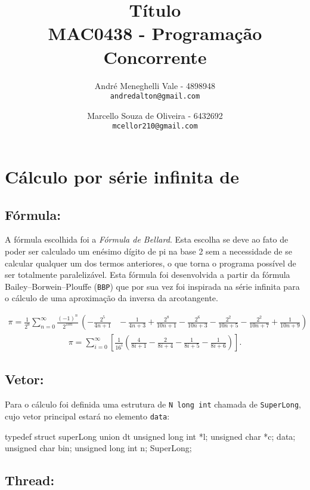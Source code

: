\documentclass[12pt,a4paper]{article}
\title{Título\\MAC0438 - Programação Concorrente}
\author{
    André Meneghelli Vale - 4898948\\
    \texttt{andredalton@gmail.com}
    \and
    Marcello Souza de Oliveira - 6432692\\
    \texttt{mcellor210@gmail.com}
}
\date{}
\begin{document}
\maketitle

\newpage

\section{Cálculo por série infinita de \pi}

\subsection{Fórmula:}
A fórmula escolhida foi a \emph{Fórmula de Bellard}. Esta escolha se deve ao fato de poder ser calculado um enésimo dígito de pi na base 2 sem a necessidade de se calcular qualquer um dos termos anteriores, o que torna o programa possível de ser totalmente paralelizável.
Esta fórmula foi desenvolvida a partir da fórmula Bailey–Borwein–Plouffe (\verb+BBP+) que por sua vez foi inspirada na série infinita para o cálculo de uma aproximação da inversa da arcotangente.

\begin{align}
\pi = \frac1{2^6} \sum_{n=0}^\infty \frac{(-1)^n}{2^{10n}} \, \left(-\frac{2^5}{4n+1} \right. & {} - \frac1{4n+3} + \frac{2^8}{10n+1} - \frac{2^6}{10n+3} \left. {} - \frac{2^2}{10n+5} - \frac{2^2}{10n+7} + \frac1{10n+9} \right)
\end{align}
\begin{align}
\pi = \sum_{i = 0}^{\infty}\left[ \frac{1}{16^i} \left( \frac{4}{8i + 1} - \frac{2}{8i + 4} - \frac{1}{8i + 5} - \frac{1}{8i + 6} \right) \right]. 
\end{align}

\subsection{Vetor:}

Para o cálculo foi definida uma estrutura de \verb+N long int+ chamada de \verb+SuperLong+, cujo vetor principal estará no elemento \verb+data+:

\begin{code}
typedef struct superLong{
       union dt{
               unsigned long int *l;
               unsigned char *c;
       } data;
       unsigned char bin;
       unsigned long int n;
} SuperLong;
\end{code}

\subsection{Thread:}
\end{document}
